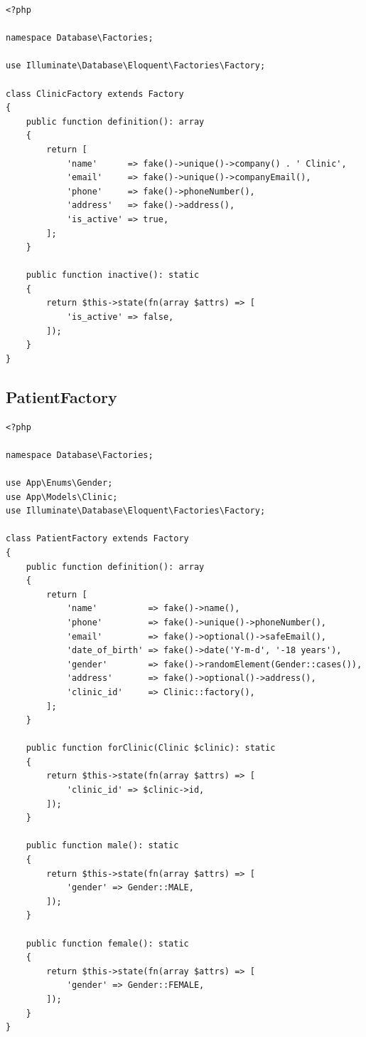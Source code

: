 \begin{lstlisting}[style=php, caption={\texttt{database/factories/ClinicFactory.php}.}]
<?php

namespace Database\Factories;

use Illuminate\Database\Eloquent\Factories\Factory;

class ClinicFactory extends Factory
{
    public function definition(): array
    {
        return [
            'name'      => fake()->unique()->company() . ' Clinic',
            'email'     => fake()->unique()->companyEmail(),
            'phone'     => fake()->phoneNumber(),
            'address'   => fake()->address(),
            'is_active' => true,
        ];
    }

    public function inactive(): static
    {
        return $this->state(fn(array $attrs) => [
            'is_active' => false,
        ]);
    }
}
\end{lstlisting}

\subsection{PatientFactory}

\begin{lstlisting}[style=php, caption={\texttt{database/factories/PatientFactory.php}.}]
<?php

namespace Database\Factories;

use App\Enums\Gender;
use App\Models\Clinic;
use Illuminate\Database\Eloquent\Factories\Factory;

class PatientFactory extends Factory
{
    public function definition(): array
    {
        return [
            'name'          => fake()->name(),
            'phone'         => fake()->unique()->phoneNumber(),
            'email'         => fake()->optional()->safeEmail(),
            'date_of_birth' => fake()->date('Y-m-d', '-18 years'),
            'gender'        => fake()->randomElement(Gender::cases()),
            'address'       => fake()->optional()->address(),
            'clinic_id'     => Clinic::factory(),
        ];
    }

    public function forClinic(Clinic $clinic): static
    {
        return $this->state(fn(array $attrs) => [
            'clinic_id' => $clinic->id,
        ]);
    }

    public function male(): static
    {
        return $this->state(fn(array $attrs) => [
            'gender' => Gender::MALE,
        ]);
    }

    public function female(): static
    {
        return $this->state(fn(array $attrs) => [
            'gender' => Gender::FEMALE,
        ]);
    }
}
\end{lstlisting}

